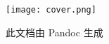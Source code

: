 
\begin{titlepage}
    \centering
    \vspace*{2cm}

    \texttt{[image: cover.png]}

    \vspace{2cm}

    {\Huge\bfseries \@title \par}

    \vspace{1cm}

    {\Large \@author \par}

    \vspace{1cm}

    {\large \@date \par}

    \vfill

    {\small 此文档由 Pandoc 生成 \par}

\end{titlepage}

\thispagestyle{empty}

\newpage
